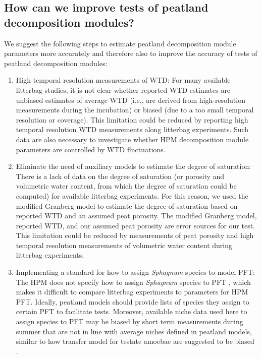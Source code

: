 \documentclass[esd, manuscript]{copernicus}
\begin{document}
\subsection{How can we improve tests of peatland decomposition modules?}

We suggest the following steps to estimate peatland decomposition module parameters more accurately and therefore also to improve the accuracy of tests of peatland decomposition modules:

\begin{enumerate}
\def\labelenumi{\arabic{enumi}.}
\item
  High temporal resolution measurements of WTD: For many available litterbag studies, it is not clear whether reported WTD estimates are unbiased estimates of average WTD (i.e., are derived from high-resolution measurements during the incubation) or biased (due to a too small temporal resolution or coverage). This limitation could be reduced by reporting high temporal resolution WTD measurements along litterbag experiments. Such data are also necessary to investigate whether HPM decomposition module parameters are controlled by WTD fluctuations.
\item
  Eliminate the need of auxiliary models to estimate the degree of saturation: There is a lack of data on the degree of saturation (or porosity and volumetric water content, from which the degree of saturation could be computed) for available litterbag experiments. For this reason, we used the modified Granberg model to estimate the degree of saturation based on reported WTD and an assumed peat porosity. The modified Granberg model, reported WTD, and our assumed peat porosity are error sources for our test. This limitation could be reduced by measurements of peat porosity and high temporal resolution measurements of volumetric water content during litterbag experiments.
\item
  Implementing a standard for how to assign \emph{Sphagnum} species to model PFT: The HPM does not specify how to assign \emph{Sphagnum} species to PFT \citep{Frolking.2010}, which makes it difficult to compare litterbag experiments to parameters for HPM PFT. Ideally, peatland models should provide lists of species they assign to certain PFT to facilitate tests. Moreover, available niche data used here to assign species to PFT may be biased by short term measurements during summer that are not in line with average niches defined in peatland models, similar to how transfer model for testate amoebae are suggested to be biased \citep{Swindles.2015}.

\end{enumerate}
\end{document}
